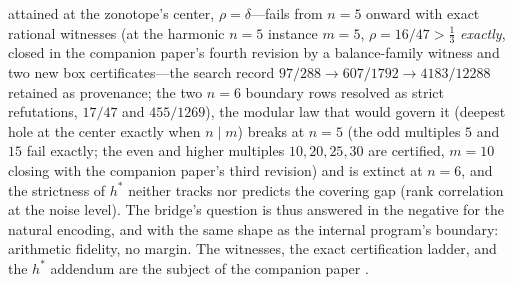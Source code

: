 \begin{enumerate}[leftmargin=1.7em,itemsep=4pt]
  attained at the zonotope's center, $\rho=\delta$---fails from $n=5$
  onward with exact rational witnesses (at the harmonic $n=5$ instance
  $m=5$, $\rho=16/47>\tfrac13$ \emph{exactly}, closed in the companion
  paper's fourth revision by a balance-family witness and two new box
  certificates---the search record
  $97/288\to607/1792\to4183/12288$ retained as provenance; the two
  $n=6$ boundary rows resolved as strict refutations, $17/47$ and
  $455/1269$), the modular law that would
  govern it (deepest hole at the center exactly when $n\mid m$) breaks
  at $n=5$ (the odd multiples $5$ and $15$ fail exactly; the even and
  higher multiples $10,20,25,30$ are certified, $m=10$ closing with
  the companion paper's third revision) and is extinct at $n=6$, and
  the strictness of $h^*$ neither
  tracks nor predicts the covering gap (rank correlation at the noise
  level). The bridge's question is thus answered in the negative for
  the natural encoding, and with the same shape as the internal
  program's boundary: arithmetic fidelity, no margin. The witnesses,
  the exact certification ladder, and the $h^*$ addendum are the
  subject of the companion paper \cite{companion-paper}.
\end{enumerate}
